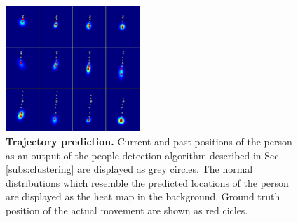 \begin{figure}
	\normalsize
	\begin{center}
		 \includegraphics[width=0.45\textwidth]{figures/trajectory_pred.png}
	\end{center}
	\caption{\textbf{Trajectory prediction.} Current and past positions of the person as an output of the people detection algorithm described in Sec. \ref{subs:clustering} are displayed as grey circles. The normal distributions which resemble the predicted locations of the person are displayed as the heat map in the background. Ground truth position of the actual movement are shown as red cicles.}
	\label{fig:trajectory_pred}
\end{figure}
